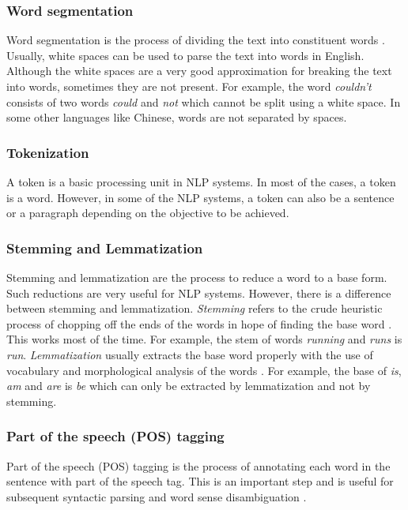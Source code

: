 \subsubsection{Word segmentation}

Word segmentation is the process of dividing the text into constituent words \cite{wiki:sentSeg}. Usually, white spaces can be used to parse the text into words in English. Although the white spaces are a very good approximation for breaking the text into words, sometimes they are not present. For example, the word \textit{couldn't} consists of two words \textit{could} and \textit{not} which cannot be split using a white space. In some other languages like Chinese, words are not separated by spaces.

\subsubsection{Tokenization}

A token is a basic processing unit in NLP systems. In most of the cases, a token is a word. However, in some of the NLP systems, a token can also be a sentence or a paragraph depending on the objective to be achieved.

\subsubsection{Stemming and Lemmatization}

Stemming and lemmatization are the process to reduce a word to a base form. Such reductions are very useful for NLP systems. However, there is a difference between stemming and lemmatization. \textit{Stemming} refers to the crude heuristic process of chopping off the ends of the words in hope of finding the base word \cite{stemminglemmatization}. This works most of the time. For example, the stem of words \textit{running} and \textit{runs} is \textit{run}. \textit{Lemmatization} usually extracts the base word properly with the use of vocabulary and morphological analysis of the words \cite{stemminglemmatization}. For example, the base of \textit{is}, \textit{am} and \textit{are} is \textit{be} which can only be extracted by lemmatization and not by stemming.

\subsubsection{Part of the speech (POS) tagging}

Part of the speech (POS) tagging is the process of annotating each word in the sentence with part of the speech tag. This is an important step and is useful for subsequent syntactic parsing and word sense disambiguation \cite{nlpcourse}. 

